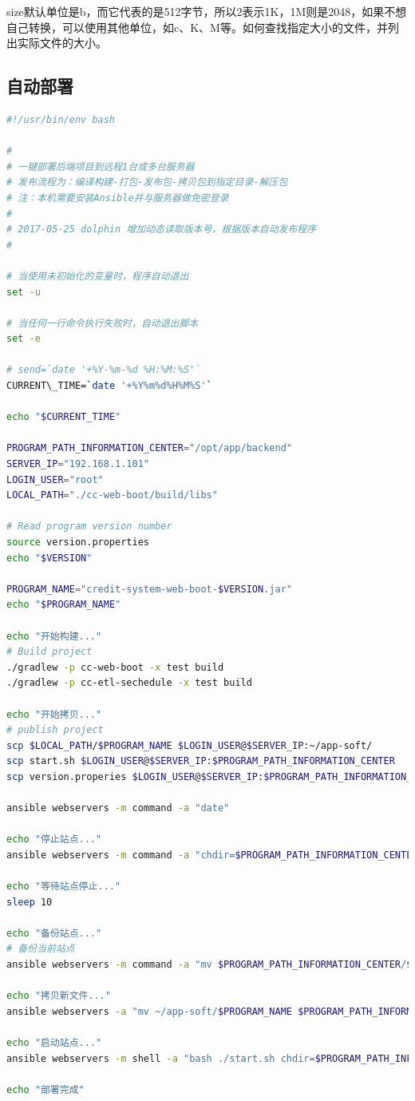 \documentclass[letter]{book}
\begin{document}
size默认单位是b，而它代表的是512字节，所以2表示1K，1M则是2048，如果不想自己转换，可以使用其他单位，如c、K、M等。如何查找指定大小的文件，并列出实际文件的大小。

\subsection{自动部署}

\begin{lstlisting}[language=Bash]
#!/usr/bin/env bash

#
# 一键部署后端项目到远程1台或多台服务器
# 发布流程为：编译构建-打包-发布包-拷贝包到指定目录-解压包
# 注：本机需要安装Ansible并与服务器做免密登录
#
# 2017-05-25 dolphin 增加动态读取版本号，根据版本自动发布程序
#

# 当使用未初始化的变量时，程序自动退出
set -u

# 当任何一行命令执行失败时，自动退出脚本
set -e

# send=`date '+%Y-%m-%d %H:%M:%S'`
CURRENT\_TIME=`date '+%Y%m%d%H%M%S'`

echo "$CURRENT_TIME"

PROGRAM_PATH_INFORMATION_CENTER="/opt/app/backend"
SERVER_IP="192.168.1.101"
LOGIN_USER="root"
LOCAL_PATH="./cc-web-boot/build/libs"

# Read program version number
source version.properties
echo "$VERSION"

PROGRAM_NAME="credit-system-web-boot-$VERSION.jar"
echo "$PROGRAM_NAME"

echo "开始构建..."
# Build project
./gradlew -p cc-web-boot -x test build
./gradlew -p cc-etl-sechedule -x test build

echo "开始拷贝..."
# publish project
scp $LOCAL_PATH/$PROGRAM_NAME $LOGIN_USER@$SERVER_IP:~/app-soft/
scp start.sh $LOGIN_USER@$SERVER_IP:$PROGRAM_PATH_INFORMATION_CENTER
scp version.properies $LOGIN_USER@$SERVER_IP:$PROGRAM_PATH_INFORMATION_CENTER

ansible webservers -m command -a "date"

echo "停止站点..."
ansible webservers -m command -a "chdir=$PROGRAM_PATH_INFORMATION_CENTER bash ./stop.sh"

echo "等待站点停止..."
sleep 10

echo "备份站点..."
# 备份当前站点
ansible webservers -m command -a "mv $PROGRAM_PATH_INFORMATION_CENTER/$PROGRAM_NAME $PROGRAM_PATH_INFORMATION_CENTER/$PROGRAM_NAME-$CURRENT_TIME"

echo "拷贝新文件..."
ansible webservers -a "mv ~/app-soft/$PROGRAM_NAME $PROGRAM_PATH_INFORMATION_CENTER"

echo "启动站点..."
ansible webservers -m shell -a "bash ./start.sh chdir=$PROGRAM_PATH_INFORMATION_CENTER"

echo "部署完成"
\end{lstlisting}
\end{document}
